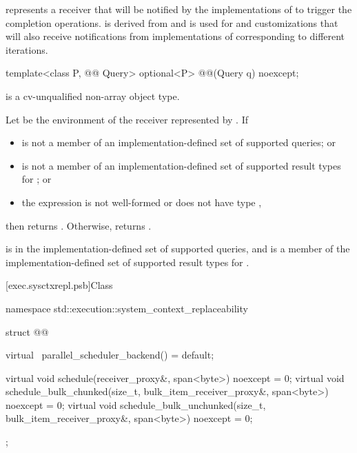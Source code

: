 \pnum
{} represents a receiver
that will be notified
by the implementations of 
to trigger the completion operations.
 is derived from  and
is used for  and  customizations
that will also receive notifications
from implementations of 
corresponding to different iterations.

\begin{itemdecl}
template<class P, @@ Query>
  optional<P> @@(Query q) noexcept;
\end{itemdecl}

\begin{itemdescr}
\pnum
\mandates
{} is a cv-unqualified non-array object type.

\pnum
\returns
Let  be the environment of the receiver represented by .
If
\begin{itemize}
\item
{} is not a member of an implementation-defined set
of supported queries; or
\item
{} is not a member of an implementation-defined set
of supported result types for ; or
\item
the expression  is not well-formed or
does not have type \cv{} ,
\end{itemize}
then returns .
Otherwise, returns .

\pnum
\remarks
{} is
in the implementation-defined set of supported queries, and
 is a member
of the implementation-defined set of supported result types
for .
\end{itemdescr}

[exec.sysctxrepl.psb]{Class }

\begin{codeblock}
namespace std::execution::system_context_replaceability {
  struct @@ {
    virtual ~parallel_scheduler_backend() = default;

    virtual void schedule(receiver_proxy&, span<byte>) noexcept = 0;
    virtual void schedule_bulk_chunked(size_t, bulk_item_receiver_proxy&,
                                       span<byte>) noexcept = 0;
    virtual void schedule_bulk_unchunked(size_t, bulk_item_receiver_proxy&,
                                         span<byte>) noexcept = 0;
  };
}
\end{codeblock}


